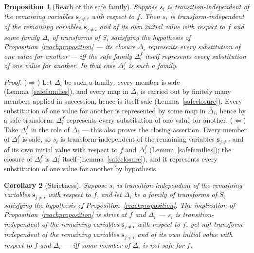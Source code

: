 \documentclass{article}
\newtheorem{proposition}{Proposition}
\newtheorem{corollary}[proposition]{Corollary}
\theoremstyle{definition}
\theoremstyle{remark}
\begin{document}
\begin{proposition}[Reach of the safe family]
\label{safereach}
Suppose $s_i$ is transition-independent of the remaining variables $\boldsymbol{s}_{j \neq i}$ with respect to $f$. Then $s_i$ is transform-independent of the remaining variables $\boldsymbol{s}_{j \neq i}$ and of its own initial value with respect to $f$ and some family $\Delta_i$ of transforms of $S_i$ satisfying the hypothesis of Proposition~\ref{reachproposition} --- its closure $\overline{\Delta}_i$ represents every substitution of one value for another --- iff the safe family $\Delta_i^f$ itself represents every substitution of one value for another. In that case $\Delta_i^f$ is such a family.
\end{proposition}

\noindent \textit{Proof.} ($\Rightarrow$) Let $\Delta_i$ be such a family: every member is safe (Lemma~\ref{safefamilies}), and every map in $\overline{\Delta}_i$ is carried out by finitely many members applied in succession, hence is itself safe (Lemma~\ref{safeclosure}). Every substitution of one value for another is represented by some map in $\overline{\Delta}_i$, hence by a safe transform: $\Delta_i^f$ represents every substitution of one value for another. ($\Leftarrow$) Take $\Delta_i^f$ in the role of $\Delta_i$ --- this also proves the closing assertion. Every member of $\Delta_i^f$ is safe, so $s_i$ is transform-independent of the remaining variables $\boldsymbol{s}_{j \neq i}$ and of its own initial value with respect to $f$ and $\Delta_i^f$ (Lemma~\ref{safefamilies}); the closure of $\Delta_i^f$ is $\Delta_i^f$ itself (Lemma~\ref{safeclosure}), and it represents every substitution of one value for another by hypothesis.

\begin{corollary}[Strictness]
\label{strictness}
Suppose $s_i$ is transition-independent of the remaining variables $\boldsymbol{s}_{j \neq i}$ with respect to $f$, and let $\Delta_i$ be a family of transforms of $S_i$ satisfying the hypothesis of Proposition~\ref{reachproposition}. The implication of Proposition~\ref{reachproposition} is strict at $f$ and $\Delta_i$ --- $s_i$ is transition-independent of the remaining variables $\boldsymbol{s}_{j \neq i}$ with respect to $f$, yet not transform-independent of the remaining variables $\boldsymbol{s}_{j \neq i}$ and of its own initial value with respect to $f$ and $\Delta_i$ --- iff some member of $\Delta_i$ is not safe for $f$.
\end{corollary}
\end{document}

